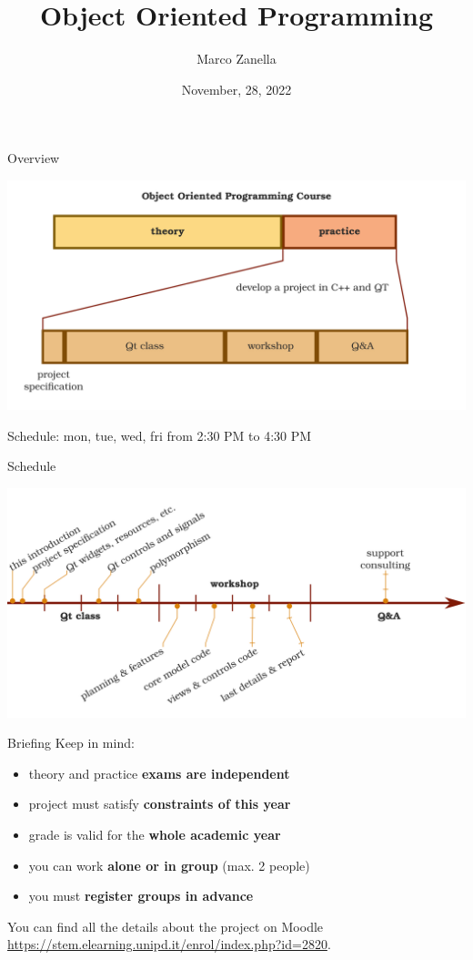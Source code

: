 \documentclass[11pt]{beamer}
\author{Marco Zanella}
\title{Object Oriented Programming}
\institute{University of Padova}
\date{November, 28, 2022}
\renewcommand{\emph}[1]{\textbf{#1}}
\begin{document}
\begin{frame}
\titlepage
\end{frame}

\begin{frame}{Overview}
 \begin{center}
  \includegraphics[width=1.0\textwidth]{assets/overview}
 \end{center}
 Schedule: mon, tue, wed, fri from 2:30 PM to 4:30 PM
\end{frame}

\begin{frame}{Schedule}
 \begin{center}
  \includegraphics[width=1.0\textwidth]{assets/schedule}
 \end{center}
\end{frame}

\begin{frame}{Briefing}
 Keep in mind:
 \begin{itemize}
  \item theory and practice \emph{exams are independent}
  \item project must satisfy \emph{constraints of this year}
  \item grade is valid for the \emph{whole academic year}
  \item you can work \emph{alone or in group} (max. 2 people)
  \item you must \emph{register groups in advance}
 \end{itemize}
 You can find all the details about the project on Moodle \url{https://stem.elearning.unipd.it/enrol/index.php?id=2820}.
\end{frame}
\end{document}
